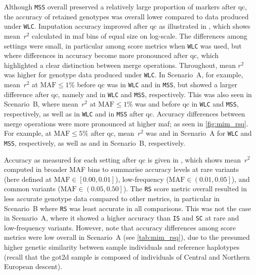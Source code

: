 %

%

Although \texttt{MSS} overall preserved a relatively large proportion of markers after \gls{qc}, the accuracy of retained genotypes was overall lower compared to data produced under \texttt{WLC}.
Imputation accuracy improved after \gls{qc} as illustrated in , which shows mean~$r^2$ calculated in \gls{maf} bins of equal size on log-scale.
The differences among settings were small, in particular among score metrics when \texttt{WLC} was used, but where differences in accuracy become more pronounced after \gls{qc}, which highlighted a clear distinction between merge operations.
Throughout, mean $r^2$ was higher for genotype data produced under \texttt{WLC}.
In Scenario~A, for example, mean~$r^2$ at ${\text{MAF} \leq 1\%}$ before \gls{qc} was
 in \texttt{WLC} and
 in \texttt{MSS}, but showed a larger difference after \gls{qc}, namely
 and
 in \texttt{WLC} and \texttt{MSS}, respectively.
This was also seen in Scenario~B,
where mean~$r^2$ at ${\text{MAF} \leq 1\%}$ was
 and
 before \gls{qc} in \texttt{WLC} and \texttt{MSS}, respectively, as well as
 in \texttt{WLC} and
 in \texttt{MSS} after \gls{qc}.
Accuracy differences between merge operations were more pronounced at higher \gls{maf}; as seen in \cref{fig:mim_rsq}.
For example, at ${\text{MAF} \leq 5\%}$ after \gls{qc}, mean~$r^2$ was
 and
in Scenario~A for \texttt{WLC} and \texttt{MSS}, respectively, as well as
 and
 in Scenario~B, respectively.

%

%

Accuracy as measured for each setting after \gls{qc} is given in , which shows mean~$r^2$ computed in  broader MAF bins to summarise accuracy levels at
rare variants (here defined at ${\text{MAF} \in \left[ 0.00, 0.01\right]}$),
low-frequency (${\text{MAF} \in \left( 0.01, 0.05\right]}$), and
common variants (${\text{MAF} \in \left( 0.05, 0.50\right]}$).
The \texttt{RS} score metric overall resulted in less accurate genotype data compared to other metrics, in particular in Scenario~B where \texttt{RS} was least accurate in all comparisons. This was not the case in Scenario~A, where it showed a higher accuracy than \texttt{IS} and \texttt{SC} at rare and low-frequency variants.
However, note that accuracy differences among score metrics were low overall in Scenario~A (see \cref{tab:mim_rsq}), due to the presumed higher genetic similarity between sample individuals and reference haplotypes (recall that the \gls{got2d} sample is composed of individuals of Central and Northern European descent).

